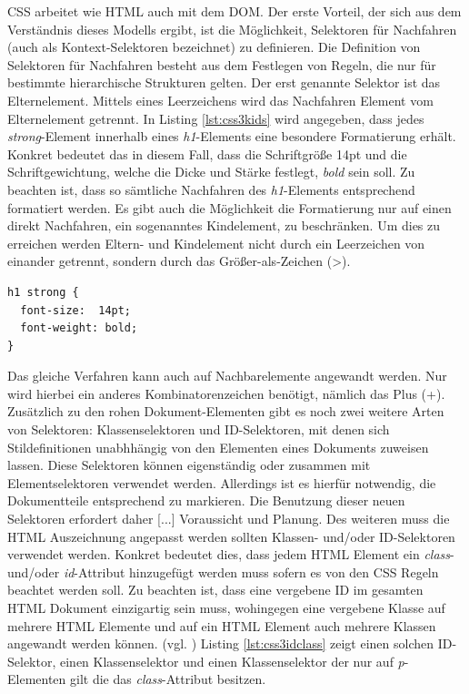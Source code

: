\documentclass[12pt,a4paper,bibliography=totocnumbered,listof=totocnumbered]{scrartcl}
\begin{document}
CSS arbeitet wie HTML auch mit dem \ac{DOM}. \glqq Der erste Vorteil, der sich aus dem Verständnis dieses Modells ergibt, ist die Möglichkeit, Selektoren für Nachfahren (auch als Kontext-Selektoren bezeichnet) zu definieren. Die Definition von Selektoren für Nachfahren besteht aus dem Festlegen von Regeln, die nur für bestimmte hierarchische Strukturen gelten.\grqq{}\cite[S.48]{MeyeCasc2005} Der erst genannte Selektor ist das Elternelement. Mittels eines Leerzeichens wird das Nachfahren Element vom Elternelement getrennt. In Listing \ref{lst:css3kids} wird angegeben, dass jedes \textit{strong}-Element innerhalb eines \textit{h1}-Elements eine besondere Formatierung erhält. Konkret bedeutet das in diesem Fall, dass die Schriftgröße 14pt und die Schriftgewichtung, welche die Dicke und Stärke festlegt, \textit{bold} sein soll. Zu beachten ist, dass so sämtliche Nachfahren des \textit{h1}-Elements entsprechend formatiert werden. Es gibt auch die Möglichkeit die Formatierung nur auf einen direkt Nachfahren, ein sogenanntes Kindelement, zu beschränken. Um dies zu erreichen werden Eltern- und Kindelement nicht durch ein Leerzeichen von einander getrennt, sondern durch das Größer-als-Zeichen (\textgreater).

	\vspace{1em}
	\begin{lstlisting}[caption=CSS3 Selektoren für Nachfahren, label=lst:css3kids]
h1 strong {
  font-size:  14pt;
  font-weight: bold;  
}
	\end{lstlisting}

Das gleiche Verfahren kann auch auf Nachbarelemente angewandt werden. Nur wird hierbei ein anderes Kombinatorenzeichen benötigt, nämlich das Plus (+).\\
\glqq Zusätzlich zu den rohen Dokument-Elementen gibt es noch zwei weitere Arten von Selektoren: Klassenselektoren und ID-Selektoren, mit denen sich Stildefinitionen unabhhängig von den Elementen eines Dokuments zuweisen lassen. Diese Selektoren können eigenständig oder zusammen mit Elementselektoren verwendet werden. Allerdings ist es hierfür notwendig, die Dokumentteile entsprechend zu markieren. Die Benutzung dieser neuen Selektoren erfordert daher [...] Voraussicht und Planung.\grqq{}\cite[S.34ff]{MeyeCasc2005} Des weiteren muss die HTML Auszeichnung angepasst werden sollten Klassen- und/oder ID-Selektoren verwendet werden. Konkret bedeutet dies, dass jedem HTML Element ein \textit{class}- und/oder \textit{id}-Attribut hinzugefügt werden muss sofern es von den CSS Regeln beachtet werden soll. Zu beachten ist, dass eine vergebene ID im gesamten HTML Dokument einzigartig sein muss, wohingegen eine vergebene Klasse auf mehrere HTML Elemente und auf ein HTML Element auch mehrere Klassen angewandt werden können. (vgl. \cite{W3ScCss2014}) Listing \ref{lst:css3idclass} zeigt einen solchen ID-Selektor, einen Klassenselektor und einen Klassenselektor der nur auf \textit{p}-Elementen gilt die das \textit{class}-Attribut besitzen.
\end{document}
